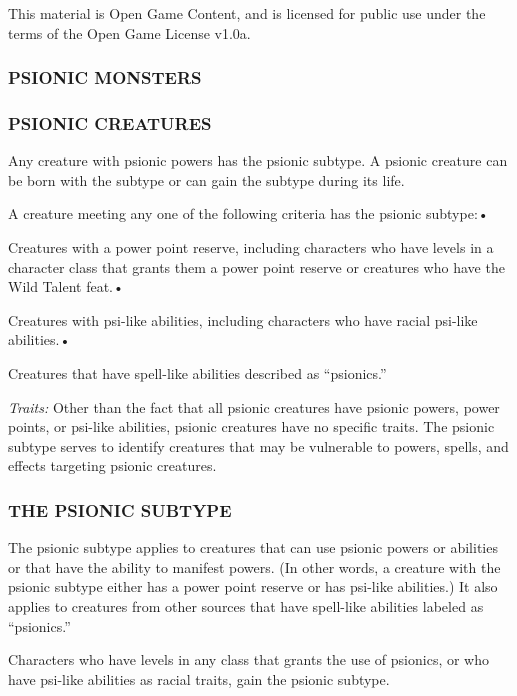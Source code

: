 \documentclass{article}
\begin{document}
This material is Open Game Content, and is licensed for public use under the terms 
of the Open Game License v1.0a.

\subsubsection*{{\LARGE{}PSIONIC MONSTERS}}

\vspace{12pt}
\subsubsection*{PSIONIC CREATURES}

Any creature with psionic powers has the psionic subtype. A psionic creature can 
be born with the subtype or can gain the subtype during its life.

A creature meeting any one of the following criteria has the psionic subtype:• 

\parindent=3pt
Creatures with a power point reserve, including characters who have levels in a 
character class that grants them a power point reserve or creatures who have the 
Wild Talent feat.• 

Creatures with psi-like abilities, including characters who have racial psi-like 
abilities.• 

\parindent=7pt
Creatures that have spell-like abilities described as ``psionics.''

\parindent=0pt
\textit{Traits: }Other than the fact that all psionic creatures have psionic powers, 
power points, or psi-like abilities, psionic creatures have no specific traits. 
The psionic subtype serves to identify creatures that may be vulnerable to powers, 
spells, and effects targeting psionic creatures.

\vspace{12pt}
\subsubsection*{THE PSIONIC SUBTYPE}

The psionic subtype applies to creatures that can use psionic powers or abilities 
or that have the ability to manifest powers. (In other words, a creature with the 
psionic subtype either has a power point reserve or has psi-like abilities.) It 
also applies to creatures from other sources that have spell-like abilities labeled 
as ``psionics.''

Characters who have levels in any class that grants the use of psionics, or who 
have psi-like abilities as racial traits, gain the psionic subtype.
\end{document}
